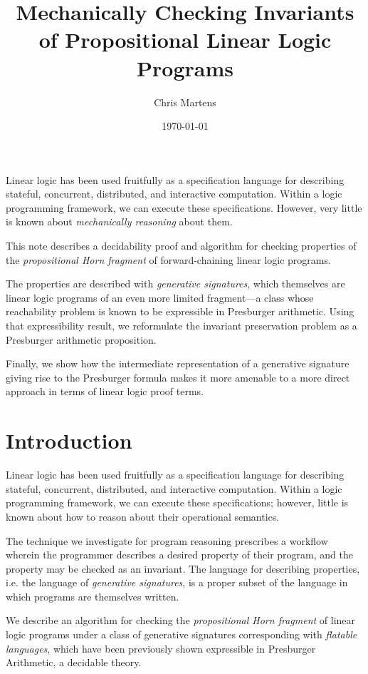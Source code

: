 \documentclass[fullpage, 11pt]{article}
\title{Mechanically Checking Invariants of Propositional Linear Logic Programs}
\author{Chris Martens}
\date{\today}
\begin{document}
\maketitle

\abstract

Linear logic has been used fruitfully as a specification language for
describing stateful, concurrent, distributed, and interactive computation.
Within a logic programming framework, we can execute these specifications.
However, very little is known about {\em mechanically reasoning} about
them.

This note describes a decidability proof and algorithm for checking
properties of the {\em propositional Horn fragment} of forward-chaining
linear logic programs.

The properties are described with {\em generative signatures}, which
themselves are linear logic programs of an even more limited
fragment---a class whose reachability problem is known to be expressible in
Presburger arithmetic. Using that expressibility result, we reformulate
the invariant preservation problem as a Presburger arithmetic proposition.

Finally, we show how the intermediate representation of a generative
signature giving rise to the Presburger formula makes it more amenable to a
more direct approach in terms of linear logic proof terms.

\section{Introduction}

Linear logic has been used fruitfully as a specification language for
describing stateful, concurrent, distributed, and interactive computation.
Within a logic programming framework, we can execute these specifications;
however, little is known about how to reason about their operational
semantics.

The technique we investigate for program reasoning prescribes a workflow
wherein the programmer describes a desired property of their program, and
the property may be checked as an invariant. The language for describing
properties, i.e. the language of {\em generative signatures}, is a proper
subset of the language in which programs are themselves written.

We describe an algorithm for checking the {\em propositional Horn fragment}
of linear logic programs under a class of generative signatures
corresponding with {\em flatable languages}, which have been previously
shown expressible in Presburger Arithmetic, a decidable theory.
\end{document}
